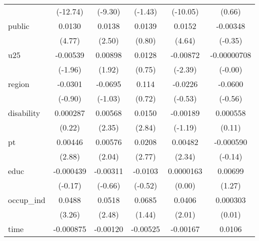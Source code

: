 {\begin{longtable}{l*{5}{c}}
            &    (-12.74)         &     (-9.30)         &     (-1.43)         &    (-10.05)         &      (0.66)         \\
public      &      0.0130\sym{***}&      0.0138\sym{*}  &      0.0139         &      0.0152\sym{***}&    -0.00348         \\
            &      (4.77)         &      (2.50)         &      (0.80)         &      (4.64)         &     (-0.35)         \\
u25         &    -0.00539         &     0.00898         &      0.0128         &    -0.00872\sym{*}  & -0.00000708         \\
            &     (-1.96)         &      (1.92)         &      (0.75)         &     (-2.39)         &     (-0.00)         \\
region      &     -0.0301         &     -0.0695         &       0.114         &     -0.0226         &     -0.0600         \\
            &     (-0.90)         &     (-1.03)         &      (0.72)         &     (-0.53)         &     (-0.56)         \\
disability  &    0.000287         &     0.00568\sym{*}  &      0.0150\sym{**} &    -0.00189         &    0.000558         \\
            &      (0.22)         &      (2.35)         &      (2.84)         &     (-1.19)         &      (0.11)         \\
pt          &     0.00446\sym{**} &     0.00576\sym{*}  &      0.0208\sym{**} &     0.00482\sym{*}  &   -0.000590         \\
            &      (2.88)         &      (2.04)         &      (2.77)         &      (2.34)         &     (-0.14)         \\
educ        &   -0.000439         &    -0.00311         &     -0.0103         &   0.0000163         &     0.00699         \\
            &     (-0.17)         &     (-0.66)         &     (-0.52)         &      (0.00)         &      (1.27)         \\
occup\_ind   &      0.0488\sym{**} &      0.0518\sym{*}  &      0.0685         &      0.0406\sym{*}  &    0.000303         \\
            &      (3.26)         &      (2.48)         &      (1.44)         &      (2.01)         &      (0.01)         \\
time        &   -0.000875         &    -0.00120         &    -0.00525         &    -0.00167         &      0.0106         \\

\end{longtable}}
